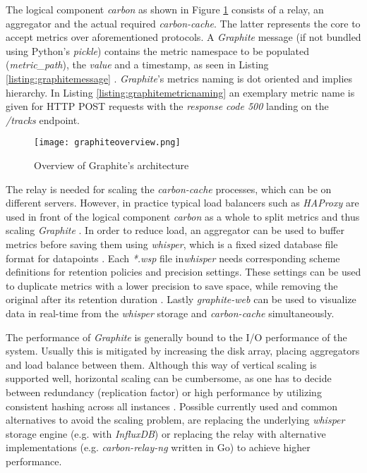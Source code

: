 The logical component \textit{carbon} as shown in Figure \ref{img:overviewgraphite} consists of a relay, an aggregator and the actual required \textit{carbon-cache}.
The latter represents the core to accept metrics over aforementioned protocols.
A \textit{Graphite} message (if not bundled using Python's \textit{pickle}) contains the metric namespace to be populated (\textit{metric\_path}), the \textit{value} and a timestamp, as seen in Listing \ref{listing:graphitemessage} \cite{Davis.08.05.2020c}.
\textit{Graphite}'s metrics naming is dot oriented and implies hierarchy.
In Listing \ref{listing:graphitemetricnaming} an exemplary metric name is given for HTTP POST requests with the \textit{response code 500} landing on the \textit{/tracks} endpoint.

\begin{figure}
	\centering
	\texttt{[image: graphiteoverview.png]}
	\caption{Overview of Graphite's architecture \cite{Davis.08.05.2020}}
	\label{img:overviewgraphite}
\end{figure}

The relay is needed for scaling the \textit{carbon-cache} processes, which can be on different servers.
However, in practice typical load balancers such as \textit{HAProxy} are used in front of the logical component \textit{carbon} as a whole to split metrics and thus scaling \textit{Graphite} \cite{Dubiel.29.05.2020}.
In order to reduce load, an aggregator can be used to buffer metrics before saving them using \textit{whisper}, which is a fixed sized database file format for datapoints \cite[p.~52]{Dixon.2017}.
Each \textit{*.wsp} file in\textit{whisper} needs corresponding scheme definitions for retention policies and precision settings.
These settings can be used to duplicate metrics with a lower precision to save space, while removing the original after its retention duration \cite[p.~55]{Dixon.2017}.
Lastly \textit{graphite-web} can be used to visualize data in real-time from the \textit{whisper} storage and \textit{carbon-cache} simultaneously.


The performance of \textit{Graphite} is generally bound to the \ac{I/O} performance of the system.
Usually this is mitigated by increasing the disk array, placing aggregators and load balance between them.
Although this way of vertical scaling is supported well, horizontal scaling can be cumbersome, as one has to decide between redundancy (replication factor) or high performance by utilizing consistent hashing across all instances \cite[p.~57ff.]{Dixon.2017}.
Possible currently used and common alternatives to avoid the scaling problem, are replacing the underlying \textit{whisper} storage engine (e.g. with \textit{InfluxDB}) or replacing the relay with alternative implementations (e.g. \textit{carbon-relay-ng} written in Go) to achieve higher performance.

